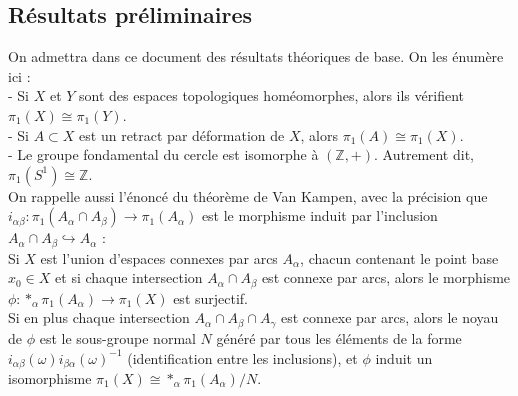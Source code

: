 \subsection{Résultats préliminaires}
On admettra dans ce document des résultats théoriques de base. On les énumère ici :\medskip\\
- Si $X$ et $Y$ sont des espaces topologiques homéomorphes, alors ils vérifient $\pi_1(X)\cong\pi_1(Y)$.\medskip\\
- Si $A\subset X$ est un retract par déformation de $X$, alors $\pi_1(A)\cong\pi_1(X)$.\medskip\\
- Le groupe fondamental du cercle est isomorphe à $(\mathbb{Z},+)$. Autrement dit, $\pi_1(S^1)\cong\mathbb{Z}$.\medskip\\
On rappelle aussi l'énoncé du théorème de Van Kampen, avec la précision que $i_{\alpha\beta}:\pi_1(A_{\alpha}\cap A_{\beta})\to\pi_1(A_{\alpha})$ est le morphisme induit par l'inclusion $A_{\alpha}\cap A_{\beta}\hookrightarrow A_{\alpha}$ :\medskip\\
Si $X$ est l'union d'espaces connexes par arcs $A_{\alpha}$, chacun contenant le point base $x_0\in X$ et si chaque intersection $A_{\alpha}\cap A_{\beta}$ est connexe par arcs, alors le morphisme $\phi:*_{\alpha}\pi_1(A_{\alpha})\to\pi_1(X)$ est surjectif.\\
Si en plus chaque intersection $A_{\alpha}\cap A_{\beta}\cap A_{\gamma}$ est connexe par arcs, alors le noyau de $\phi$ est le sous-groupe normal $N$ généré par tous les éléments de la forme $i_{\alpha\beta}(\omega)i_{\beta\alpha}(\omega)^{-1}$ (identification entre les inclusions), et $\phi$ induit un isomorphisme $\pi_1(X)\cong*_{\alpha}\pi_1(A_{\alpha})/N$.

